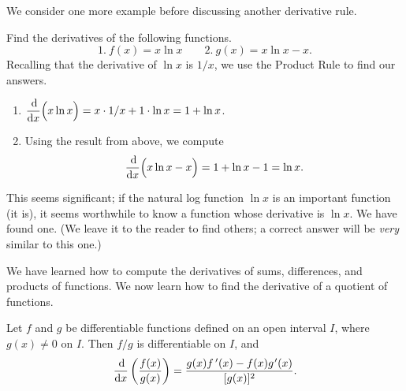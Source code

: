 We consider one more example before discussing another derivative rule.

\begin{example}\label{ex_deriv_ln}%
Find the derivatives of the following functions.
\[1.\ f(x) = x\ln x\qquad 2.\ g(x) = x\ln x - x.\]
\solution
Recalling that the derivative of $\ln x$ is $1/x$, we use the Product Rule to find our answers.
\begin{enumerate}
	\item	$\displaystyle \frac{\operatorname{d}\!}{\operatorname{d}\! x}\Bigl(x\ln x\Bigr) = x\cdot 1/x + 1\cdot \ln x = 1+\ln x$. 
	\item	Using the result from above, we compute
	\[\displaystyle \frac{\operatorname{d}\!}{\operatorname{d}\! x}\Bigl(x\ln x-x\Bigr) = 1+\ln x-1 = \ln x.\]
\end{enumerate}
This seems significant; if the natural log function $\ln x$ is an important function (it is), it seems worthwhile to know a function whose derivative is $\ln x$. We have found one. (We leave it to the reader to find others; a correct answer will be \emph{very} similar to this one.)
\end{example}

We have learned how to compute the derivatives of sums, differences, and products of functions. We now learn how to find the derivative of a quotient of functions.\bigskip

\begin{theorem}\label{thm:QuotientRule}%
Let $f$ and $g$ be differentiable functions defined on an open interval $I$, where $g(x) \neq 0$ on $I$. Then $f/g$ is differentiable on $I$, and
\[\frac{\dd}{\dd x}\left(\frac{f(x)}{g(x)}\right) = \frac{g(x)\fp(x) - f(x)g\primeskip'(x)}{[g(x)]^2}.\]
\end{theorem}


